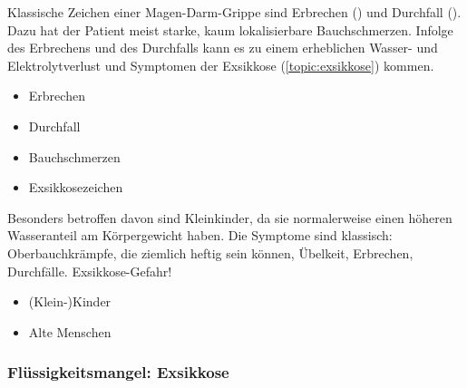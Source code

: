 {
Klassische Zeichen einer Magen-Darm-Grippe sind Erbrechen
() und Durchfall (). Dazu hat
der Patient meist starke, kaum lokalisierbare
Bauchschmerzen. Infolge des 
Erbrechens und des Durchfalls kann es zu einem erheblichen 
Wasser- und Elektrolytverlust und Symptomen der Exsikkose
(\ref{topic:exsikkose}) kommen. 

}{
\begin{itemize}
    \item Erbrechen 
    \item Durchfall 
    \item Bauchschmerzen
    \item Exsikkosezeichen
\end{itemize}
}{}{}{}

{%
Besonders betroffen davon sind Kleinkinder, da sie
normalerweise einen höheren Wasseranteil am Körpergewicht
haben.  Die Symptome sind klassisch: Oberbauchkrämpfe,
die ziemlich heftig sein können, Übelkeit, Erbrechen, Durchfälle.
Exsikkose-Gefahr! 
}{
\begin{itemize}
    \item (Klein-)Kinder
    \item Alte Menschen
\end{itemize}
}{}{}{}









\subsubsection{Flüssigkeitsmangel: Exsikkose}
\label{topic:exsikkose}

